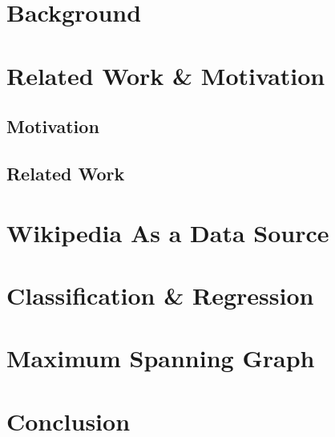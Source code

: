 \documentclass[bsc,frontabs,twoside,singlespacing,parskip,deptreport]{infthesis}     %
\begin{document}
\chapter{Background}

\chapter{Related Work \& Motivation}
\section{Motivation}
\section{Related Work}


\chapter{Wikipedia As a Data Source}

\chapter{Classification \& Regression}

\chapter{Maximum Spanning Graph}

\chapter{Conclusion}



\end{document}
